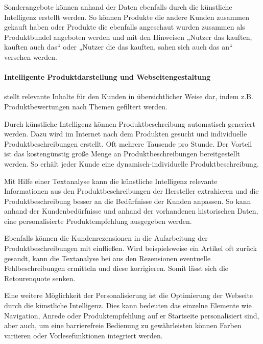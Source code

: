 Sonderangebote können anhand der Daten ebenfalls durch die künstliche Intelligenz erstellt werden. So können Produkte die andere Kunden zusammen gekauft haben oder Produkte die ebenfalls angeschaut wurden zusammen als Produktbundel angeboten werden und mit den Hinweisen „Nutzer das kauften, kauften auch das“ oder „Nutzer die das kauften, sahen sich auch das an“ versehen werden.

\paragraph{Intelligente Produktdarstellung und Webseitengestaltung} stellt relevante Inhalte für den Kunden in übersichtlicher Weise dar, indem z.B. Produktbewertungen nach Themen gefiltert werden.\vspace{0.2cm}

Durch künstliche Intelligenz können Produktbeschreibung automatisch generiert werden. Dazu wird im Internet nach dem Produkten gesucht und individuelle Produktbeschreibungen erstellt. Oft mehrere Tausende pro Stunde. Der Vorteil ist das kostengünstig große Menge an Produktbeschreibungen bereitgestellt werden. So erhält jeder Kunde eine dynamisch-individuelle Produktbeschreibung.\vspace{0.2cm}

Mit Hilfe einer Textanalyse kann die künstliche Intelligenz relevante Informationen aus den Produktbeschreibungen der Hersteller extrahieren und die Produktbeschreibung besser an die Bedürfnisse der Kunden anpassen. So kann anhand der Kundenbedürfnisse und anhand der vorhandenen historischen Daten, eine personalisierte Produktempfehlung ausgegeben werden.\vspace{0.2cm}

Ebenfalls können die Kundenrezensionen in die Aufarbeitung der Produktbeschreibungen mit einfließen. Wird beispielsweise ein Artikel oft zurück gesandt, kann die Textanalyse bei  aus den Rezensionen eventuelle Fehlbeschreibungen ermitteln und diese korrigieren. Somit lässt sich die Retourenquote senken.\vspace{0.2cm}

Eine weitere Möglichkeit der Personalisierung ist die Optimierung der Webseite durch die künstliche Intelligenz. Dies kann bedeuten das einzelne Elemente wie Navigation, Anrede oder Produktempfehlung auf er Startseite personalisiert sind, aber auch, um eine barrierefreie Bedienung zu gewährleisten können Farben variieren oder Vorlesefunktionen integriert werden.

